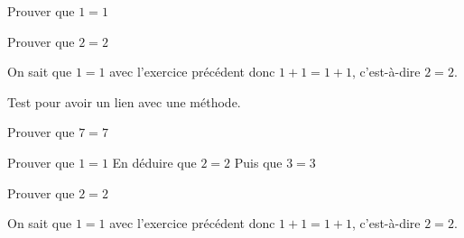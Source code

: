 \documentclass[nocrop]{sesamanuel}
\begin{document}
\exercicesbase
\begin{colonne*exercice}
  \begin{exercice}
  Prouver que $1=1$
  \end{exercice}
  \begin{exercice*}
  Prouver que $2=2$
  \end{exercice*}
  \begin{corrige}
  On sait que $1=1$ avec l’exercice précédent donc $1+1=1+1$,
  c’est-à-dire $2=2$.
  \end{corrige}
  \begin{exercice}
  \label{exo-exemple1}
  Test pour avoir un lien avec une méthode.
  \end{exercice}
  \begin{exercice}
    Prouver que $7=7$
  \end{exercice}

  \begin{exercice}
    \partie
    Prouver que $1=1$
    \partie
    En déduire que $2=2$
    \partie 
    Puis que $3=3$
  \end{exercice}
  \begin{exercice*}
  Prouver que $2=2$
  \end{exercice*}
  \begin{corrige}
  On sait que $1=1$ avec l’exercice précédent donc $1+1=1+1$,
  c’est-à-dire $2=2$.
  \end{corrige}
\end{colonne*exercice}
\end{document}
